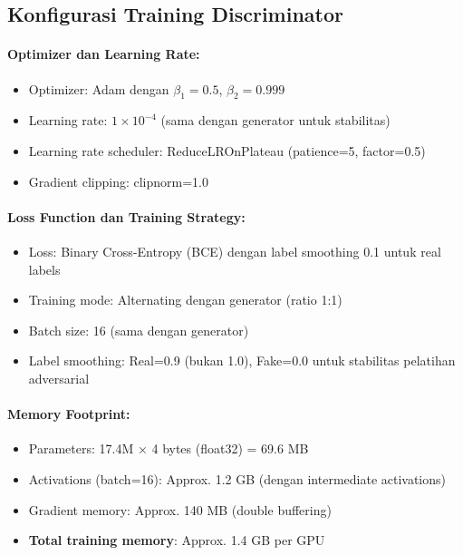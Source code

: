 \subsection{Konfigurasi Training Discriminator}

\paragraph{Optimizer dan Learning Rate:}
\begin{itemize}[nosep]
    \item Optimizer: Adam dengan $\beta_1=0.5$, $\beta_2=0.999$
    \item Learning rate: $1 \times 10^{-4}$ (sama dengan generator untuk stabilitas)
    \item Learning rate scheduler: ReduceLROnPlateau (patience=5, factor=0.5)
    \item Gradient clipping: clipnorm=1.0
\end{itemize}

\paragraph{Loss Function dan Training Strategy:}
\begin{itemize}[nosep]
    \item Loss: Binary Cross-Entropy (BCE) dengan label smoothing 0.1 untuk real labels
    \item Training mode: Alternating dengan generator (ratio 1:1)
    \item Batch size: 16 (sama dengan generator)
    \item Label smoothing: Real=0.9 (bukan 1.0), Fake=0.0 untuk stabilitas pelatihan adversarial
\end{itemize}

\paragraph{Memory Footprint:}
\begin{itemize}[nosep]
    \item Parameters: 17.4M × 4 bytes (float32) = 69.6 MB
    \item Activations (batch=16): Approx. 1.2 GB (dengan intermediate activations)
    \item Gradient memory: Approx. 140 MB (double buffering)
    \item \textbf{Total training memory}: Approx. 1.4 GB per GPU
\end{itemize}

